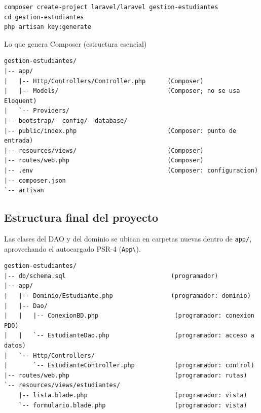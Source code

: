 \documentclass[11pt,a4paper,openany]{book}
\begin{document}
\begin{lstlisting}[style=shell,caption={Creacion del proyecto Laravel},label={lst:lv-create}]
composer create-project laravel/laravel gestion-estudiantes
cd gestion-estudiantes
php artisan key:generate
\end{lstlisting}

\begin{cajaejemplo}{Lo que genera Composer (estructura esencial)}
\begin{lstlisting}[style=shell,caption={Esqueleto creado por laravel/laravel},label={lst:lv-skel}]
gestion-estudiantes/
|-- app/
|   |-- Http/Controllers/Controller.php      (Composer)
|   |-- Models/                              (Composer; no se usa Eloquent)
|   `-- Providers/
|-- bootstrap/  config/  database/
|-- public/index.php                         (Composer: punto de entrada)
|-- resources/views/                         (Composer)
|-- routes/web.php                           (Composer)
|-- .env                                     (Composer: configuracion)
|-- composer.json
`-- artisan
\end{lstlisting}
\end{cajaejemplo}

\subsection{Estructura final del proyecto}
\label{ap:crud:laravel:estructura}

Las clases del DAO y del dominio se ubican en carpetas nuevas dentro de
\texttt{app/}, aprovechando el autocargado PSR-4 (\texttt{App\textbackslash}).

\begin{lstlisting}[style=shell,caption={Estructura completa de la pista Laravel},label={lst:lv-tree}]
gestion-estudiantes/
|-- db/schema.sql                             (programador)
|-- app/
|   |-- Dominio/Estudiante.php                (programador: dominio)
|   |-- Dao/
|   |   |-- ConexionBD.php                     (programador: conexion PDO)
|   |   `-- EstudianteDao.php                  (programador: acceso a datos)
|   `-- Http/Controllers/
|       `-- EstudianteController.php           (programador: control)
|-- routes/web.php                             (programador: rutas)
`-- resources/views/estudiantes/
    |-- lista.blade.php                        (programador: vista)
    `-- formulario.blade.php                   (programador: vista)
\end{lstlisting}
\end{document}
